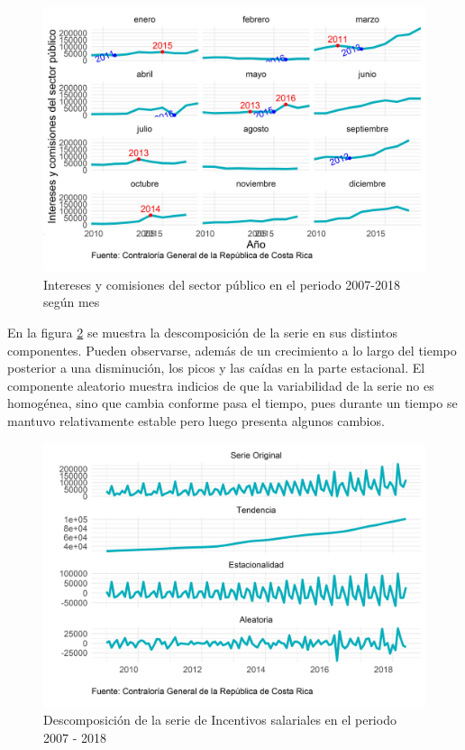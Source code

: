 \documentclass[
]{article}
\begin{document}
\begin{figure}[H]
\includegraphics[width=1\linewidth,height=1\textheight]{Tesis_files/figure-latex/interesesplotperiodos-1} \caption{Intereses y comisiones del sector público en el periodo 2007-2018 según mes}\label{fig:interesesplotperiodos}
\end{figure}

En la figura \ref{fig:interesesplotdescomposicion} se muestra la
descomposición de la serie en sus distintos componentes. Pueden
observarse, además de un crecimiento a lo largo del tiempo posterior a
una disminución, los picos y las caídas en la parte estacional. El
componente aleatorio muestra indicios de que la variabilidad de la serie
no es homogénea, sino que cambia conforme pasa el tiempo, pues durante
un tiempo se mantuvo relativamente estable pero luego presenta algunos
cambios.

\begin{figure}[H]
\includegraphics[width=1\linewidth,height=1\textheight]{Tesis_files/figure-latex/interesesplotdescomposicion-1} \caption{Descomposición de la serie de Incentivos salariales en el periodo 2007 - 2018}\label{fig:interesesplotdescomposicion}
\end{figure}
\end{document}
